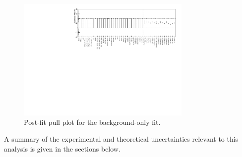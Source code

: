 \begin{figure}[htbp]
	\begin{center}
		\includegraphics[width=0.75\textwidth, angle=90]{HistFitterStuff/pullPlot.pdf}
		\caption{Post-fit pull plot for the background-only fit.}
		\label{figure.pullPlot}
	\end{center}
\end{figure}

\indent A summary of the experimental and theoretical uncertainties relevant to this analysis is given in the sections below. \\



